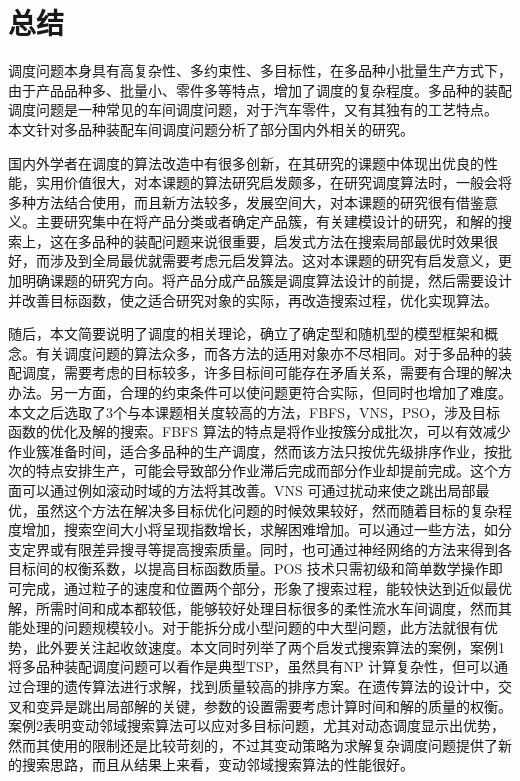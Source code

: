 \chapter{总结}

调度问题本身具有高复杂性、多约束性、多目标性，在多品种小批量生产方式下，由于产品品种多、批量小、零件多等特点，增加了调度的复杂程度。多品种的装配调度问题是一种常见的车间调度问题，对于汽车零件，又有其独有的工艺特点。
本文针对多品种装配车间调度问题分析了部分国内外相关的研究。

国内外学者在调度的算法改造中有很多创新，在其研究的课题中体现出优良的性能，实用价值很大，对本课题的算法研究启发颇多，在研究调度算法时，一般会将多种方法结合使用，而且新方法较多，发展空间大，对本课题的研究很有借鉴意义。主要研究集中在将产品分类或者确定产品簇，有关建模设计的研究，和解的搜索上，这在多品种的装配问题来说很重要，启发式方法在搜索局部最优时效果很好，而涉及到全局最优就需要考虑元启发算法。这对本课题的研究有启发意义，更加明确课题的研究方向。将产品分成产品簇是调度算法设计的前提，然后需要设计并改善目标函数，使之适合研究对象的实际，再改造搜索过程，优化实现算法。

随后，本文简要说明了调度的相关理论，确立了确定型和随机型的模型框架和概念。有关调度问题的算法众多，而各方法的适用对象亦不尽相同。对于多品种的装配调度，需要考虑的目标较多，许多目标间可能存在矛盾关系，需要有合理的解决办法。另一方面，合理的约束条件可以使问题更符合实际，但同时也增加了难度。本文之后选取了3个与本课题相关度较高的方法，FBFS，VNS，PSO，涉及目标函数的优化及解的搜索。FBFS 算法的特点是将作业按簇分成批次，可以有效减少作业簇准备时间，适合多品种的生产调度，然而该方法只按优先级排序作业，按批次的特点安排生产，可能会导致部分作业滞后完成而部分作业却提前完成。这个方面可以通过例如滚动时域的方法将其改善。VNS 可通过扰动来使之跳出局部最优，虽然这个方法在解决多目标优化问题的时候效果较好，然而随着目标的复杂程度增加，搜索空间大小将呈现指数增长，求解困难增加。可以通过一些方法，如分支定界或有限差异搜寻等提高搜索质量。同时，也可通过神经网络的方法来得到各目标间的权衡系数，以提高目标函数质量。POS 技术只需初级和简单数学操作即可完成，通过粒子的速度和位置两个部分，形象了搜索过程，能较快达到近似最优解，所需时间和成本都较低，能够较好处理目标很多的柔性流水车间调度，然而其能处理的问题规模较小。对于能拆分成小型问题的中大型问题，此方法就很有优势，此外要关注起收敛速度。本文同时列举了两个启发式搜索算法的案例，案例1将多品种装配调度问题可以看作是典型TSP，虽然具有NP 计算复杂性，但可以通过合理的遗传算法进行求解，找到质量较高的排序方案。在遗传算法的设计中，交叉和变异是跳出局部解的关键，参数的设置需要考虑计算时间和解的质量的权衡。案例2表明变动邻域搜索算法可以应对多目标问题，尤其对动态调度显示出优势，然而其使用的限制还是比较苛刻的，不过其变动策略为求解复杂调度问题提供了新的搜索思路，而且从结果上来看，变动邻域搜索算法的性能很好。